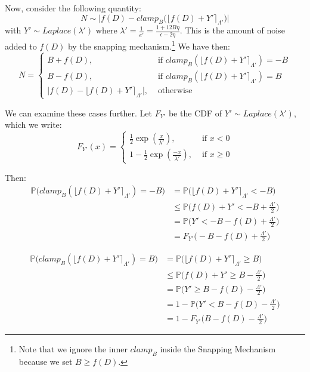 \documentclass[11pt]{scrartcl} %
\begin{document}
Now, consider the following quantity:
\[ N \sim \big \vert f(D) - clamp_B \big( \lfloor f(D) + Y' \rceil_{\Lambda'} \big) \big \vert \]
with $Y' \sim Laplace(\lambda')$ where $\lambda' = \frac{1}{e'} = \frac{1 + 12B \eta}{\epsilon - 2\eta}$. This is the amount of noise added to $f(D)$ by the snapping mechanism.\footnote{Note that we ignore the inner $clamp_B$ inside the Snapping Mechanism because we set $B \geq f(D)$.} We have then:
\begin{equation}
	N =
		\label{snapped_noise}
		\begin{cases}
			B + f(D), &\text{ if } clamp_B \left( \lfloor f(D) + Y' \rceil_{\Lambda'} \right) = -B  \\
			B - f(D), &\text{ if } clamp_B \left( \lfloor f(D) + Y' \rceil_{\Lambda'} \right) = B  \\
			\big\vert f(D) - \lfloor f(D) + Y' \rceil_{\Lambda'} \big\vert, &\text{ otherwise }
		\end{cases}
\end{equation}

We can examine these cases further. Let $F_{Y'}$ be the CDF of $Y' \sim Laplace(\lambda')$, which we write:
\begin{equation}
	F_{Y'}(x) =
		\begin{cases}
			\frac{1}{2} \exp \left( \frac{x}{\lambda'} \right), &\text{ if } x < 0 \\
			1 - \frac{1}{2} \exp \left( \frac{-x}{\lambda'} \right), &\text{ if } x \geq 0
		\end{cases}
\end{equation}

Then:
\begin{align}
	               \mathbb{P} \big( clamp_B\left( \lfloor f(D) + Y' \rceil_{\Lambda'} \right) = -B \big) \nonumber &= \mathbb{P} \big( \lfloor f(D) + Y' \rceil_{\Lambda'} < -B \big) \nonumber \\
	&\leq \mathbb{P} \big( f(D) + Y' < -B + \frac{\Lambda'}{2} \big) \nonumber \\
	&= \mathbb{P} \big( Y' < -B - f(D) + \frac{\Lambda'}{2} \big) \nonumber \\
	&= F_{Y'} \big( -B - f(D) + \frac{\Lambda'}{2} \big) \nonumber
\end{align}

\begin{align}
	               \mathbb{P} \big( clamp_B\left( \lfloor f(D) + Y' \rceil_{\Lambda'} \right) = B \big) \nonumber &= \mathbb{P} \big( \lfloor f(D) + Y' \rceil_{\Lambda'} \geq B \big) \nonumber \\
	&\leq \mathbb{P} \big( f(D) + Y' \geq B - \frac{\Lambda'}{2} \big) \nonumber \\
	&= \mathbb{P} \big( Y' \geq B - f(D) - \frac{\Lambda'}{2} \big) \nonumber \\
	&= 1 - \mathbb{P} \big( Y' < B - f(D) - \frac{\Lambda'}{2} \big) \nonumber \\
	&= 1 - F_{Y'} \big( B - f(D) - \frac{\Lambda'}{2} \big) \nonumber
\end{align}
\end{document}
